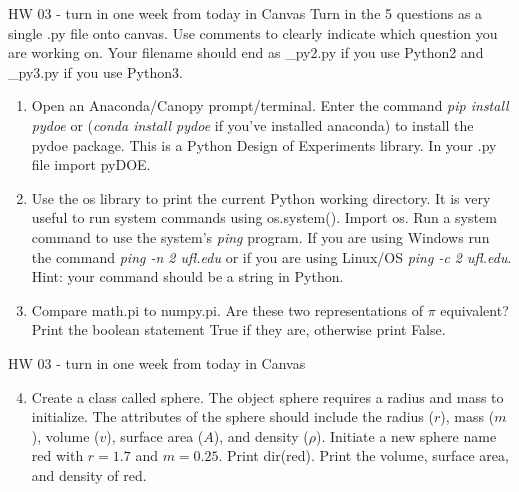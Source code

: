 \documentclass[10pt]{beamer}
\begin{document}
\begin{frame}[fragile]{HW 03 - turn in one week from today in Canvas}
Turn in the 5 questions as a single .py file onto canvas. Use comments to clearly indicate which question you are working on. Your filename should end as \_py2.py if you use Python2 and \_py3.py if you use Python3.
\begin{enumerate}
\item Open an Anaconda/Canopy prompt/terminal. Enter the command \textit{pip install pydoe} or (\textit{conda install pydoe} if you've installed anaconda) to install the pydoe package. This is a Python Design of Experiments library. In your .py file import pyDOE.
\item Use the os library to print the current Python working directory. It is very useful to run system commands using os.system(). Import os. Run a system command to use the system's \textit{ping} program. If you are using Windows run the command \textit{ping -n 2 ufl.edu} or if you are using Linux/OS  \textit{ping -c 2 ufl.edu}. Hint: your command should be a string in Python.
\item Compare math.pi to numpy.pi. Are these two representations of $\pi$ equivalent? Print the boolean statement True if they are, otherwise print False.
\end{enumerate}

\end{frame}


\begin{frame}[fragile]{HW 03 - turn in one week from today in Canvas}
\begin{enumerate}
\setcounter{enumi}{3}
\item Create a class called sphere. The object sphere requires a radius and mass to initialize. The attributes of the sphere should include the radius ($r$), mass ($m$), volume ($v$), surface area ($A$), and density ($\rho$). Initiate a new sphere name red with $r=1.7$ and $m=0.25$. Print dir(red). Print the volume, surface area, and density of red.
\end{enumerate}
\end{frame}
\end{document}
